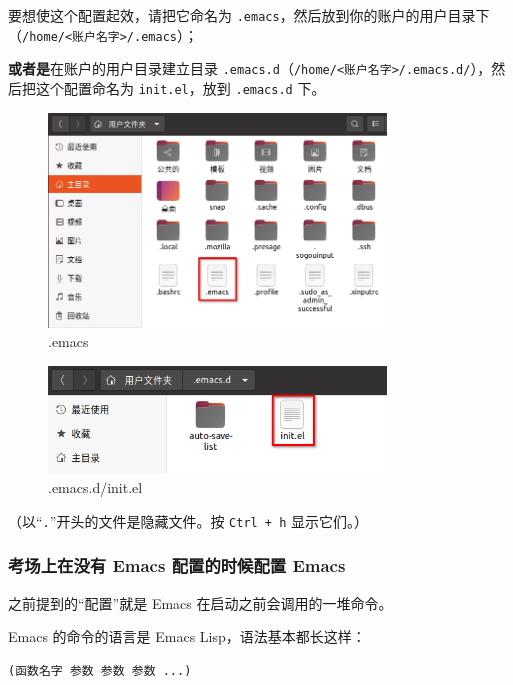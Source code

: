 \documentclass[UTF-8]{ctexart}
\begin{document}
				要想使这个配置起效，请把它命名为 \texttt{.emacs}，然后放到你的账户的用户目录下（\texttt{/home/<账户名字>/.emacs}）；
				
				\textbf{或者是}在账户的用户目录建立目录 \texttt{.emacs.d}（\texttt{/home/<账户名字>/.emacs.d/}），然后把这个配置命名为 \texttt{init.el}，放到 \texttt{.emacs.d} 下。
				
				\begin{figure}[H]
					\centering
					\includegraphics[width=0.8\textwidth]{fig/place_emacs.png}
					\caption*{.emacs}
				\end{figure}
			
				\begin{figure}[H]
					\centering
					\includegraphics[width=0.8\textwidth]{fig/place_init_el.png}
					\caption*{.emacs.d/init.el}
				\end{figure}
				
				（以“\texttt{.}”开头的文件是隐藏文件。按 \texttt{Ctrl + h} 显示它们。）
			
			\subsubsection{考场上在没有 Emacs 配置的时候配置 Emacs}
			
				之前提到的“配置”就是 Emacs 在启动之前会调用的一堆命令。
				
				Emacs 的命令的语言是 Emacs Lisp，语法基本都长这样：
				
				\begin{verbatim}
(函数名字 参数 参数 参数 ...)
				\end{verbatim}
			
\end{document}
